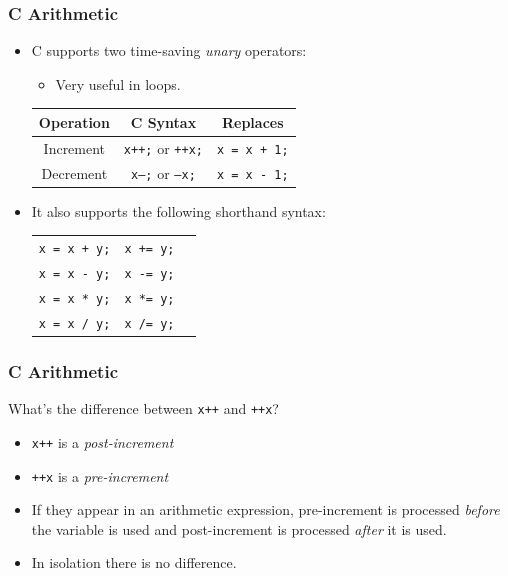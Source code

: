 \documentclass[14pt]{beamer}
\begin{document}
\begin{frame}
\frametitle{C Arithmetic}
\begin{itemize}
\item C supports two time-saving \textit{unary} operators:
\begin{itemize}
\item Very useful in loops.
\end{itemize}

\begin{table}
\centering
\begin{tabular}{|c|c|c|}
\hline
Operation & C Syntax & Replaces\\
\hline
Increment & \texttt{x++;} or \texttt{++x;} & \texttt{x = x + 1;} \\
Decrement & \texttt{x--;} or \texttt{--x;} & \texttt{x = x - 1;} \\
\hline
\end{tabular}
\end{table}

\item It also supports the following shorthand syntax:

\begin{table}
\centering
\begin{tabular}{|c|c|c|}
\hline
\texttt{x = x + y;} & \texttt{x += y;} \\
\texttt{x = x - y;} & \texttt{x -= y;} \\
\texttt{x = x * y;} & \texttt{x *= y;} \\
\texttt{x = x / y;} & \texttt{x /= y;} \\
\hline
\end{tabular}
\end{table}
\end{itemize}
\end{frame}

\begin{frame}
\frametitle{C Arithmetic}
What's the difference between \texttt{x++} and \texttt{++x}?
\begin{itemize}
\item \texttt{x++} is a \textit{post-increment}
\item \texttt{++x} is a \textit{pre-increment}
\item If they appear in an arithmetic expression, pre-increment is processed \textit{before} the variable is used and post-increment is processed \textit{after} it is used.
\item In isolation there is no difference.
\end{itemize}
\end{frame}
\end{document}
